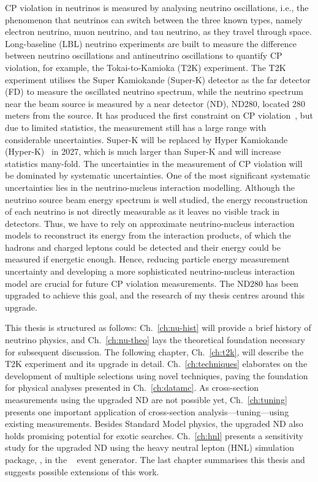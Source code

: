CP violation in neutrinos is measured by analysing neutrino oscillations, i.e., the phenomenon that neutrinos can switch between the three known types, namely electron neutrino, muon neutrino, and tau neutrino, as they travel through space. 
Long-baseline (LBL) neutrino experiments are built to measure the difference between neutrino oscillations and antineutrino oscillations to quantify CP violation, for example, the Tokai-to-Kamioka (T2K) experiment. 
The T2K experiment utilises the Super Kamiokande (Super-K) detector as the far detector (FD) to measure the oscillated neutrino spectrum, while the neutrino spectrum near the beam source is measured by a near detector (ND), ND280, located 280 meters from the source. 
It has produced the first constraint on CP violation~\cite{T2K:2019bcf}, but due to limited statistics, the measurement still has a large range with considerable uncertainties.
Super-K will be replaced by Hyper Kamiokande (Hyper-K)~\cite{Hyper-Kamiokande:2018ofw} in 2027, which is much larger than Super-K and will increase statistics many-fold. 
The uncertainties in the measurement of CP violation will be dominated by systematic uncertainties. 
One of the most significant systematic uncertainties lies in the neutrino-nucleus interaction modelling. 
Although the neutrino source beam energy spectrum is well studied, the energy reconstruction of each neutrino is not directly measurable as it leaves no visible track in detectors. 
Thus, we have to rely on approximate neutrino-nucleus interaction models to reconstruct its energy from the interaction products, of which the hadrons and charged leptons could be detected and their energy could be measured if energetic enough. 
Hence, reducing particle energy measurement uncertainty and developing a more sophisticated neutrino-nucleus interaction model are crucial for future CP violation measurements.
The ND280 has been upgraded to achieve this goal, and the research of my thesis centres around this upgrade. 

This thesis is structured as follows: Ch.~\ref{ch:nu-hist} will provide a brief history of neutrino physics, and Ch.~\ref{ch:nu-theo} lays the theoretical foundation necessary for subsequent discussion. 
The following chapter, Ch.~\ref{ch:t2k}, will describe the T2K experiment and its upgrade in detail. 
Ch.~\ref{ch:techniques} elaborates on the development of multiple selections using novel techniques, paving the foundation for physical analyses presented in Ch.~\ref{ch:datamc}. 
As cross-section measurements using the upgraded ND are not possible yet, Ch.~\ref{ch:tuning} presents one important application of cross-section analysis—tuning—using existing measurements.
Besides Standard Model physics, the upgraded ND also holds promising potential for exotic searches.
Ch.~\ref{ch:hnl} presents a sensitivity study for the upgraded ND using the heavy neutral lepton (HNL) simulation package, , in the \genie~\cite{Andreopoulos:2015wxa} event generator.
The last chapter summarises this thesis and suggests possible extensions of this work.



